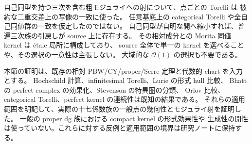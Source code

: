 \begin{remark}
自己同型を持つ三次を含む粗モジュライへの射について、点ごとの Torelli は
被約な二重交差上の写像の一致に使った。
任意基底上の categorical Torelli や全自己同値群の一致を仮定したのではない。
自己同型が自明な開へ縮小すれば、普遍三次族の引戻しが source 上に存在する。
その相対成分との Morita 同値 kernel は étale 局所に構成しており、
source 全体で単一の kernel を選べることや、その選択の一意性は主張しない。
大域的な $\mathcal O(1)$ の選択も不要である。
\end{remark}

\begin{remark}[証明の入力と適用範囲]
本節の証明は、既存の相対 PBW/CY/proper/Serre 定理と代数的 chart を入力とする。
Hochschild 計算、infinitesimal Torelli、Lurie の形式 hull 比較、
Bhatt の perfect complex の効果化、Stevenson の特異圏の分類、
Orlov 比較、categorical Torelli、perfect kernel の連続性は既知の結果である。
それらの適用範囲を明記して、実際の十七係数族の一般点の幾何性とモジュライ射を証明した。
一般の proper dg 族における compact kernel の形式効果性や
生成性の開性は使っていない。これらに対する反例と適用範囲の境界は研究ノートに保持する。
\end{remark}
